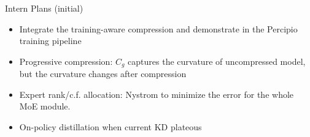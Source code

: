 \documentclass[9pt]{beamer}
\begin{document}
	\begin{frame}{Intern Plans (initial)}
		\begin{itemize}
			\item Integrate the training-aware compression and demonstrate in the Percipio training pipeline
			\item Progressive compression: $C_g$ captures the curvature of uncompressed model, but the curvature changes after compression
			\item Expert rank/c.f. allocation: Nystrom to minimize the error for the whole MoE module. 
			\item On-policy distillation when current KD plateous
		\end{itemize}
		
		
%		
%			
%			
%			
%			
%
%

	\end{frame}

	
	
	
\end{document}
